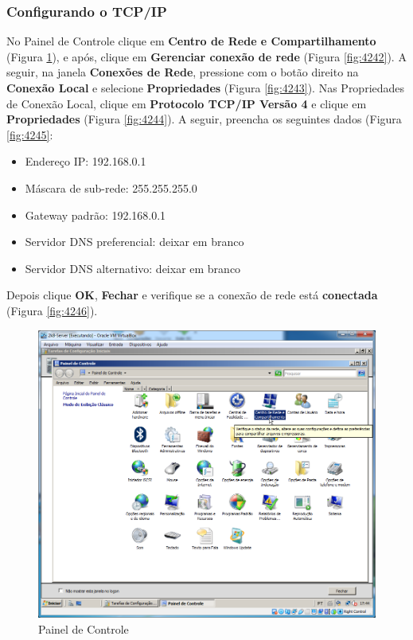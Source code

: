 \documentclass[10pt]{article}
\begin{document}
\subsubsection{Configurando o TCP/IP}
\par No Painel de Controle clique em \textbf{Centro de Rede e Compartilhamento} (Figura \ref{fig:4241}), e após, clique em \textbf{Gerenciar conexão de rede} (Figura \ref{fig:4242}). A seguir, na janela \textbf{Conexões de Rede}, pressione com o botão direito na \textbf{Conexão Local} e selecione \textbf{Propriedades} (Figura \ref{fig:4243}). Nas Propriedades de Conexão Local, clique em \textbf{Protocolo TCP/IP Versão 4} e clique em \textbf{Propriedades} (Figura \ref{fig:4244}). A seguir, preencha os seguintes dados (Figura \ref{fig:4245}: 
\begin{itemize}
    \item Endereço IP: 192.168.0.1
    \item Máscara de sub-rede: 255.255.255.0
    \item Gateway padrão: 192.168.0.1
    \item Servidor DNS preferencial: deixar em branco
    \item Servidor DNS alternativo: deixar em branco
\end{itemize}
\par Depois clique \textbf{OK}, \textbf{Fechar} e verifique se a conexão de rede está \textbf{conectada} (Figura \ref{fig:4246}).
\begin{figure}[H]
    \centering
    \caption{Painel de Controle}
    \label{fig:4241}
    \includegraphics[width=\linewidth]{images/configuracao_windows/windows_server/021.png}
\end{figure}
\end{document}
